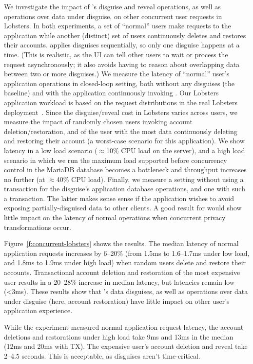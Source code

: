 %
We investigate the impact of \sys's disguise and reveal operations, as well as
operations over data under disguise, on other concurrent user requests in Lobsters.
%
In both experiments, a set of ``normal'' users make requests to the application
while another (distinct) set of users continuously deletes and restores their
accounts.
%
\sys applies disguises sequentially, so only one disguise happens at a time.
%
(This is realistic, as the UI can tell other users to wait or process the request
asynchronously; it also avoids \sys having to reason about overlapping data between
two or more disguises.)
%
We measure the latency of ``normal'' user's application operations in closed-loop
setting, both without any disguises (the baseline) and with the application
continuously invoking \sys.
%
Our Lobsters application workload is based on the request distributions in the real
Lobsters deployment~\cite{lobsters-data}.
%
Since the disguise/reveal cost in Lobsters varies across users, we measure the
impact of randomly chosen users invoking account deletion/restoration, and of
the user with the most data continuously deleting and restoring their account
(a worst-case scenario for this application).
%
We show latency in a low load scenario ($\approx$10\% CPU load on the server),
and a high load scenario in which we run the maximum load supported before
concurrency control in the MariaDB database becomes a bottleneck
and throughput increases no further (at $\approx$40\% CPU load).
%
Finally, we measure a setting without using a transaction for the disguise's
application database operations, and one with such a transaction.
%
The latter makes sense sense if the application wishes to avoid exposing
partially-disguised data to other clients.
%
A good result for \sys would show little impact on the latency of normal operations
when concurrent privacy transformations occur.
%

%
Figure~\ref{f:concurrent-lobsters} shows the results.
%
The median latency of normal application requests increases by 6--20\% (from
1.5ms to 1.6--1.7ms under low load, and 1.8ms to 1.9ms under high load) when
random users delete and restore their accounts.
%
Transactional account deletion and restoration of the most expensive user
results in a 20--28\% increase in median latency, but latencies remain low (<3ms).
These results show that \sys's data disguises, as well as operations over data under disguise (here, account restoration) have little impact on other user's application experience.
%

%
While the experiment measured normal application request latency, the
account deletions and restorations under high load take
9ms and 13ms in the median (12ms and 20ms with TX).
%
The expensive user's account deletion and reveal take 2--4.5 seconds.
%
This is acceptable, as disguises aren't time-critical.
%

